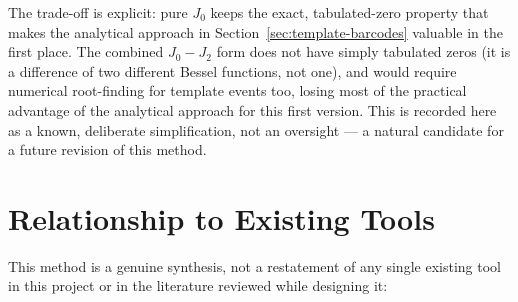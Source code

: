 \documentclass[11pt]{article}
\begin{document}
The trade-off is explicit: pure $J_0$ keeps the exact, tabulated-zero property that makes the
analytical approach in Section~\ref{sec:template-barcodes} valuable in the first place. The
combined $J_0 - J_2$ form does not have simply tabulated zeros (it is a difference of two
different Bessel functions, not one), and would require numerical root-finding for template
events too, losing most of the practical advantage of the analytical approach for this first
version. This is recorded here as a known, deliberate simplification, not an oversight --- a
natural candidate for a future revision of this method.

\section{Relationship to Existing Tools}
\label{sec:relationship}

This method is a genuine synthesis, not a restatement of any single existing tool in this project
or in the literature reviewed while designing it:
\end{document}
